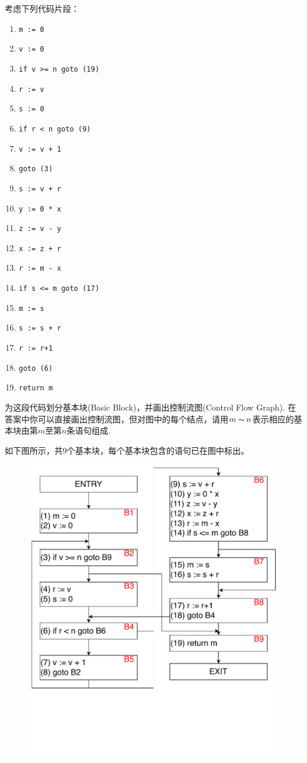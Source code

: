 \begin{example}
考虑下列代码片段：
\begin{enumerate}[label=(\arabic*)]
\item \verb'm := 0'
\item \verb'v := 0'
\item \verb'if v >= n goto (19)'
\item \verb'r := v'
\item \verb's := 0'
\item \verb'if r < n goto (9)'
\item \verb'v := v + 1'
\item \verb'goto (3)'
\item \verb's := v + r'
\item \verb'y := 0 * x'
\item \verb'z := v - y'
\item \verb'x := z + r'
\item \verb'r := m - x'
\item \verb'if s <= m goto (17)'
\item \verb'm := s'
\item \verb's := s + r'
\item \verb'r := r+1'
\item \verb'goto (6)'
\item \verb'return m'
\end{enumerate}
为这段代码划分基本块(Basic Block)，并画出控制流图(Control Flow Graph).
在答案中你可以直接画出控制流图，但对图中的每个结点，请用$m\thicksim n$表示相应的基本块由第$m$至第$n$条语句组成.
\end{example}
\begin{analysis}
如下图所示，共$9$个基本块，每个基本块包含的语句已在图中标出。
\begin{figure}[H]
\centering
\includegraphics[width=0.7\linewidth]{fig/dag-2.pdf}
\end{figure}
\end{analysis}
